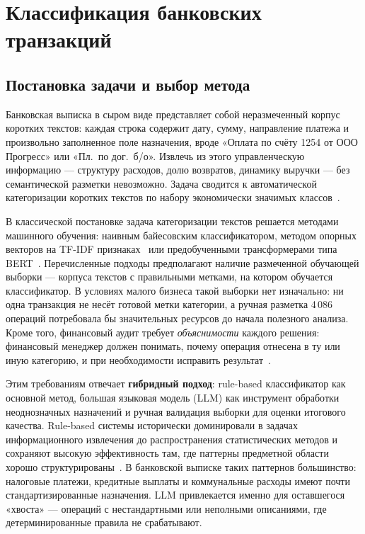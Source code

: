 \chapter{Классификация банковских транзакций}

\section{Постановка задачи и выбор метода}

Банковская выписка в сыром виде представляет собой неразмеченный корпус коротких текстов: каждая строка содержит дату, сумму, направление платежа и произвольно заполненное поле назначения, вроде «Оплата по счёту 1254 от ООО Прогресс» или «Пл.\ по дог.\ б/о». Извлечь из этого управленческую информацию --- структуру расходов, долю возвратов, динамику выручки --- без семантической разметки невозможно. Задача сводится к автоматической категоризации коротких текстов по набору экономически значимых классов~\cite{aggarwal2012survey}.

В классической постановке задача категоризации текстов решается методами машинного обучения: наивным байесовским классификатором, методом опорных векторов на TF-IDF признаках~\cite{sebastiani2002machine} или предобученными трансформерами типа BERT~\cite{devlin2018bert}. Перечисленные подходы предполагают наличие размеченной обучающей выборки --- корпуса текстов с правильными метками, на котором обучается классификатор. В условиях малого бизнеса такой выборки нет изначально: ни одна транзакция не несёт готовой метки категории, а ручная разметка 4\,086 операций потребовала бы значительных ресурсов до начала полезного анализа. Кроме того, финансовый аудит требует \textit{объяснимости} каждого решения: финансовый менеджер должен понимать, почему операция отнесена в ту или иную категорию, и при необходимости исправить результат~\cite{whittington2012principles}.

Этим требованиям отвечает \textbf{гибридный подход}: rule-based классификатор как основной метод, большая языковая модель (LLM) как инструмент обработки неоднозначных назначений и ручная валидация выборки для оценки итогового качества. Rule-based системы исторически доминировали в задачах информационного извлечения до распространения статистических методов и сохраняют высокую эффективность там, где паттерны предметной области хорошо структурированы~\cite{Cohen1995}. В банковской выписке таких паттернов большинство: налоговые платежи, кредитные выплаты и коммунальные расходы имеют почти стандартизированные назначения. LLM привлекается именно для оставшегося «хвоста» --- операций с нестандартными или неполными описаниями, где детерминированные правила не срабатывают.

